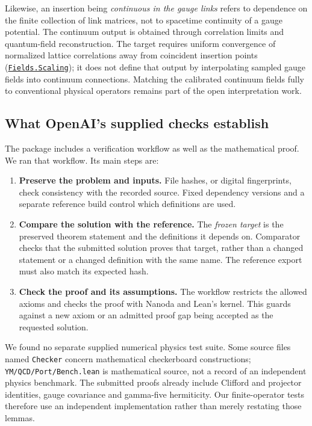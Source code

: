 \documentclass[
  11pt,
]{article}
\providecommand{\tightlist}{%
  \setlength{\itemsep}{0pt}\setlength{\parskip}{0pt}}
\begin{document}
Likewise, an insertion being \emph{continuous in the gauge links} refers
to dependence on the finite collection of link matrices, not to
spacetime continuity of a gauge potential. The continuum output is
obtained through correlation limits and quantum-field reconstruction.
The target requires uniform convergence of normalized lattice
correlations away from coincident insertion points
(\href{https://github.com/yang-mills-group/QCD/blob/main/provenance/supplied-comparator/frozen/reference/YM/Massive/Target/Euclidean.lean\#L140}{{\small \nolinkurl{Fields.Scaling}}});
it does not define that output by interpolating sampled gauge fields
into continuum connections. Matching the calibrated continuum fields
fully to conventional physical operators remains part of the open
interpretation work.

\subsection{What OpenAI's supplied checks
establish}\label{what-openais-supplied-checks-establish}

The package includes a verification workflow as well as the mathematical
proof. We ran that workflow. Its main steps are:

\begin{enumerate}
\def\labelenumi{\arabic{enumi}.}
\tightlist
\item
  \textbf{Preserve the problem and inputs.} File hashes, or digital
  fingerprints, check consistency with the recorded source. Fixed
  dependency versions and a separate reference build control which
  definitions are used.
\item
  \textbf{Compare the solution with the reference.} The \emph{frozen
  target} is the preserved theorem statement and the definitions it
  depends on. Comparator checks that the submitted solution proves that
  target, rather than a changed statement or a changed definition with
  the same name. The reference export must also match its expected hash.
\item
  \textbf{Check the proof and its assumptions.} The workflow restricts
  the allowed axioms and checks the proof with Nanoda and Lean's kernel.
  This guards against a new axiom or an admitted proof gap being
  accepted as the requested solution.
\end{enumerate}

We found no separate supplied numerical physics test suite. Some source
files named {\small \nolinkurl{Checker}} concern mathematical
checkerboard constructions; {\small \nolinkurl{YM/QCD/Port/Bench.lean}}
is mathematical source, not a record of an independent physics
benchmark. The submitted proofs already include Clifford and projector
identities, gauge covariance and gamma-five hermiticity. Our
finite-operator tests therefore use an independent implementation rather
than merely restating those lemmas.
\end{document}
